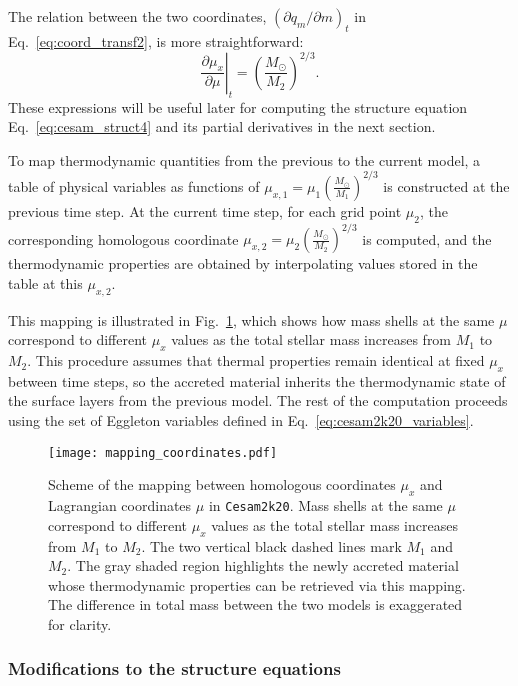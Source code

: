 \documentclass[12pt,a4paper]{article}
\newcommand{\pfird}[2][]{\frac{\partial#1}{\partial#2}}
\begin{document}
The relation between the two coordinates, $\left(\partial q_m/\partial m\right)_t$ in Eq.~\eqref{eq:coord_transf2}, is more straightforward:
\begin{equation}
  \left.\pfird[\mu_x]{\mu}\right|_t = \left(\frac{M_\odot}{M_2}\right)^{2/3}. 
\end{equation}
These expressions will be useful later for computing the structure equation Eq.~\eqref{eq:cesam_struct4} and its partial derivatives in the next section.

To map thermodynamic quantities from the previous to the current model, a table of physical variables as functions of $\mu_{x,1} = \mu_1 \left(\frac{M_\odot}{M_1}\right)^{2/3}$ is constructed at the previous time step. At the current time step, for each grid point $\mu_2$, the corresponding homologous coordinate $\mu_{x,2} = \mu_2 \left(\frac{M_\odot}{M_2}\right)^{2/3}$ is computed, and the thermodynamic properties are obtained by interpolating values stored in the table at this $\mu_{x,2}$. 

This mapping is illustrated in Fig.~\ref{fig:mapping_coordinates}, which shows how mass shells at the same $\mu$ correspond to different $\mu_x$ values as the total stellar mass increases from $M_1$ to $M_2$. This procedure assumes that thermal properties remain identical at fixed $\mu_x$ between time steps, so the accreted material inherits the thermodynamic state of the surface layers from the previous model. The rest of the computation proceeds using the set of Eggleton variables defined in Eq.~\eqref{eq:cesam2k20_variables}.

\begin{figure}
  \centering
  \texttt{[image: mapping\_coordinates.pdf]}
  \caption{Scheme of the mapping between homologous coordinates $\mu_x$ and Lagrangian coordinates $\mu$ in \texttt{Cesam2k20}. Mass shells at the same $\mu$ correspond to different $\mu_x$ values as the total stellar mass increases from $M_1$ to $M_2$. The two vertical black dashed lines mark $M_1$ and $M_2$. The gray shaded region highlights the newly accreted material whose thermodynamic properties can be retrieved via this mapping. The difference in total mass between the two models is exaggerated for clarity.} \label{fig:mapping_coordinates}
\end{figure}

\subsubsection{Modifications to the structure equations}
\label{sec:accretion_struct_eq}
\end{document}

